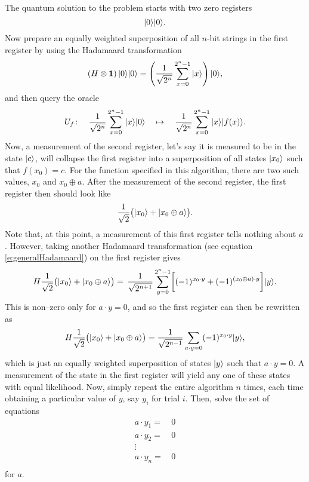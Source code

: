 The quantum solution to the problem starts with two zero registers
\begin{equation}
{|{0}\rangle}{|{0}\rangle}.
\end{equation}
Now prepare an equally weighted superposition of all $n$-bit strings
in the first register by using the Hadamaard transformation
\begin{equation}
\left(H\otimes\bf{1}\right){|{0}\rangle}{|{0}\rangle} =
\left(\frac{1}{\sqrt{2^n}}\sum_{x=0}^{2^n-1}{|{x}\rangle}\right){|{0}\rangle},
\end{equation}
and then query the oracle
\begin{equation}
U_f\colon\quad
\frac{1}{\sqrt{2^n}}\sum_{x=0}^{2^n-1}{|{x}\rangle}{|{0}\rangle}\quad\mapsto\quad
\frac{1}{\sqrt{2^n}}\sum_{x=0}^{2^n-1}{|{x}\rangle}{|{f(x)}\rangle}.
\end{equation}
Now, a measurement of the second register, let's say it is measured
to be in the state ${|{c}\rangle}$,
will collapse the first register into a superposition of all 
states ${|{x_0}\rangle}$ such that $f(x_0)=c$.  
For the function specified in this algorithm, 
there are two such values, $x_0$ and $x_0\oplus a$.
After the measurement of the second register, 
the first register then should look like 
\begin{equation}
\frac{1}{\sqrt{2}}\bigl({|{x_0}\rangle}+{|{x_0\oplus a}\rangle}\bigr).
\end{equation}
Note that, at this point, a measurement of this first register tells
nothing about $a$.  However, taking another Hadamaard transformation 
(see equation \ref{e:generalHadamaard})
on the first register gives 
\begin{equation}
H \frac{1}{\sqrt{2}}\bigl({|{x_0}\rangle}+{|{x_0\oplus a}\rangle}\bigr)=
\,\frac{1}{\sqrt{2^{n+1}}}\sum_{y=0}^{2^n-1}
\biggl[(-1)^{x_0\cdot y}+(-1)^{(x_0\oplus a)\cdot y}\biggr]{|{y}\rangle}.
\end{equation}
This is non--zero only for $a\cdot y=0$, and so the first register
can then be rewritten as
\begin{equation}
H \frac{1}{\sqrt{2}}\bigl({|{x_0}\rangle}+{|{x_0\oplus a}\rangle}\bigr)
=\frac{1}{\sqrt{2^{n-1}}}\sum_{a\cdot y=0}
(-1)^{x_0\cdot y}{|{y}\rangle},
\end{equation}
which is just an equally weighted superposition of states
${|{y}\rangle}$ such that $a\cdot y = 0$.
A measurement of the state in the first register will yield
any one of these states with equal likelihood.  Now, simply
repeat the entire algorithm $n$ times, each time obtaining
a particular value of $y$, say $y_i$ for trial $i$.
Then, solve the set of equations
\begin{equation}
\begin{split}
a\cdot y_1 =&\, 0\\
a\cdot y_2 =&\, 0\\
\vdots\quad&\\
a\cdot y_n =&\, 0\\
\end{split}
\end{equation}
for $a$.




